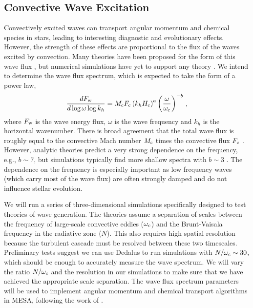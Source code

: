 {\color{purple}
\subsection{Convective Wave Excitation}
}

Convectively excited waves can transport angular momentum and chemical species in stars, leading to interesting diagnostic and evolutionary effects. However, the strength of these effects are proportional to the flux of the waves excited by convection. Many theories have been proposed for the form of this wave flux \citep{Press_1981,Goldreich_1990,Belkacem_2008,Lecoanet_2013}, but numerical simulations have yet to support any theory \citep{Rogers_2006,Rogers_2013,Alvan_2014,Lecoanet_2015}. We intend to determine the wave flux spectrum, which is expected to take the form of a power law,
\begin{equation}
\frac{d F_{\rm w}}{d\log \omega \log k_h} = M_{\rm c}F_{\rm c} \left(k_h H_{\rm c}\right)^{a} \left(\frac{\omega}{\omega_{\rm c}}\right)^{-b} \, ,
\end{equation}
where $F_{\rm w}$ is the wave energy flux, $\omega$ is the wave frequency and $k_h$ is the horizontal wavenumber. There is broad agreement that the total wave flux is roughly equal to the convective Mach number $M_{\rm c}$ times the convective flux $F_{\rm c}$ \citep[e.g.,][]{Rogers_2013,Lecoanet_2015}. However, analytic theories predict a very strong dependence on the frequency, e.g., $b\sim 7$, but simulations typically find more shallow spectra with $b\sim 3$ \citep{Rogers_2013}. The dependence on the frequency is especially important as low frequency waves (which carry most of the wave flux) are often strongly damped and do not influence stellar evolution. 

We will run a series of three-dimensional simulations specifically designed to test theories of wave generation. The theories assume a separation of scales between the frequency of large-scale convective eddies ($\omega_{\rm c}$) and the Brunt-Vaisala frequency in the radiative zone ($N$). This also requires high spatial resolution because the turbulent cascade must be resolved between these two timescales. Preliminary tests suggest we can use Dedalus to run simulations with $N/\omega_{\rm c}\sim 30$, which should be enough to accurately measure the wave spectrum. We will vary the ratio $N/\omega_{\rm c}$ and the resolution in our simulations to make sure that we have achieved the appropriate scale separation. The wave flux spectrum parameters will be used to implement angular momentum and chemical transport algorithms in MESA, following the work of \citet{fullerwave:14,fullerwave:15}.  %

